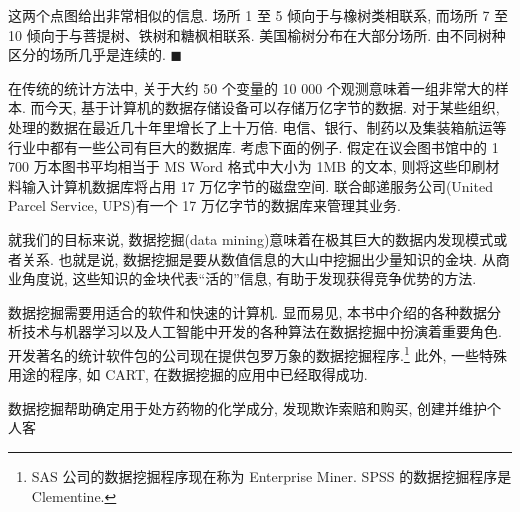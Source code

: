 
\begin{mvfigure}
\label{fig:12.29}
\end{mvfigure}

这两个点图给出非常相似的信息. 场所 1 至 5 倾向于与橡树类相联系, 而场所 7 至 10 倾向于与菩提树、铁树和糖枫相联系. 美国榆树分布在大部分场所. 由不同树种区分的场所几乎是连续的. \hfill$\blacksquare$



在传统的统计方法中, 关于大约 50 个变量的 10 000 个观测意味着一组非常大的样本. 而今天, 基于计算机的数据存储设备可以存储万亿字节的数据. 对于某些组织, 处理的数据在最近几十年里增长了上十万倍. 电信、银行、制药以及集装箱航运等行业中都有一些公司有巨大的数据库. 考虑下面的例子. 假定在议会图书馆中的 1 700 万本图书平均相当于 MS Word 格式中大小为 1MB 的文本, 则将这些印刷材料输入计算机数据库将占用 17 万亿字节的磁盘空间. 联合邮递服务公司(United Parcel Service, UPS)有一个 17 万亿字节的数据库来管理其业务.

就我们的目标来说, 数据挖掘(data mining)意味着在极其巨大的数据内发现模式或者关系. 也就是说, 数据挖掘是要从数值信息的大山中挖掘出少量知识的金块. 从商业角度说, 这些知识的金块代表“活的”信息, 有助于发现获得竞争优势的方法.

数据挖掘需要用适合的软件和快速的计算机. 显而易见, 本书中介绍的各种数据分析技术与机器学习以及人工智能中开发的各种算法在数据挖掘中扮演着重要角色. 开发著名的统计软件包的公司现在提供包罗万象的数据挖掘程序.\footnote{SAS 公司的数据挖掘程序现在称为 Enterprise Miner. SPSS 的数据挖掘程序是 Clementine.} 此外, 一些特殊用途的程序, 如 CART, 在数据挖掘的应用中已经取得成功.

数据挖掘帮助确定用于处方药物的化学成分, 发现欺诈索赔和购买, 创建并维护个人客
